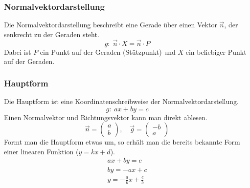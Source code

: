 \subsubsection{Normalvektordarstellung}
Die Normalvektordarstellung beschreibt eine Gerade über einen Vektor $\vec{n}$, der senkrecht zu der Geraden steht.
\begin{equation}
    g:\;\vec{n}\cdot X=\vec{n}\cdot P
\end{equation}
Dabei ist $P$ ein Punkt auf der Geraden (Stützpunkt) und $X$ ein beliebiger Punkt auf der Geraden.  
\begin{center}
\end{center}

\subsubsection{Hauptform}
Die Hauptform ist eine Koordinatenschreibweise der Normalvektordarstellung.
\begin{equation}
    g:\;a x + b y = c
\end{equation}
Einen Normalvektor und Richtungsvektor kann man direkt ablesen.
\begin{equation}
    \vec{n}=\begin{pmatrix} a \\ b \end{pmatrix},\quad 
    \vec{g} = \begin{pmatrix} -b \\ a \end{pmatrix}
\end{equation}
Formt man die Hauptform etwas um, so erhält man die bereits bekannte Form einer linearen Funktion ($y = k x + d$).
\begin{align}
    a x + b y = c \\
    b y = -a x + c \\
    y = -\frac{a}{b} x + \frac{c}{b}
\end{align}

